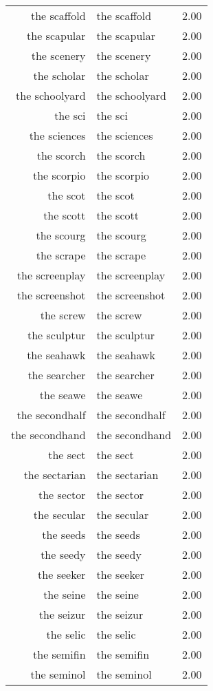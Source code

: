 \begin{table}[ht]
\begin{tabular}{rlr}
  the scaffold & the scaffold & 2.00 \\ 
  the scapular & the scapular & 2.00 \\ 
  the scenery & the scenery & 2.00 \\ 
  the scholar & the scholar & 2.00 \\ 
  the schoolyard & the schoolyard & 2.00 \\ 
  the sci & the sci & 2.00 \\ 
  the sciences & the sciences & 2.00 \\ 
  the scorch & the scorch & 2.00 \\ 
  the scorpio & the scorpio & 2.00 \\ 
  the scot & the scot & 2.00 \\ 
  the scott & the scott & 2.00 \\ 
  the scourg & the scourg & 2.00 \\ 
  the scrape & the scrape & 2.00 \\ 
  the screenplay & the screenplay & 2.00 \\ 
  the screenshot & the screenshot & 2.00 \\ 
  the screw & the screw & 2.00 \\ 
  the sculptur & the sculptur & 2.00 \\ 
  the seahawk & the seahawk & 2.00 \\ 
  the searcher & the searcher & 2.00 \\ 
  the seawe & the seawe & 2.00 \\ 
  the secondhalf & the secondhalf & 2.00 \\ 
  the secondhand & the secondhand & 2.00 \\ 
  the sect & the sect & 2.00 \\ 
  the sectarian & the sectarian & 2.00 \\ 
  the sector & the sector & 2.00 \\ 
  the secular & the secular & 2.00 \\ 
  the seeds & the seeds & 2.00 \\ 
  the seedy & the seedy & 2.00 \\ 
  the seeker & the seeker & 2.00 \\ 
  the seine & the seine & 2.00 \\ 
  the seizur & the seizur & 2.00 \\ 
  the selic & the selic & 2.00 \\ 
  the semifin & the semifin & 2.00 \\ 
  the seminol & the seminol & 2.00 \\ 

\end{tabular}
\end{table}
